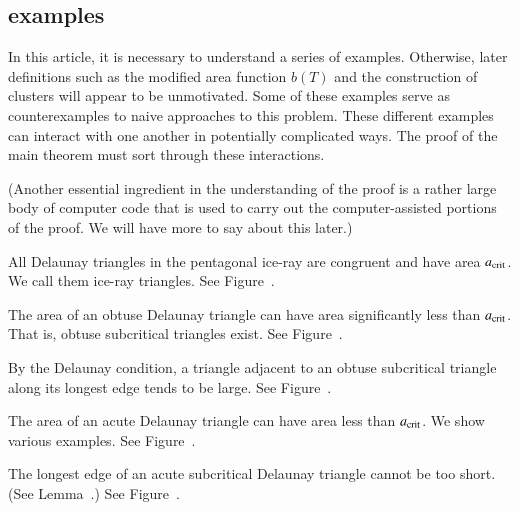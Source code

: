 \subsection{examples}

In this article, it is necessary to understand a series of examples.
Otherwise, later definitions such as the modified area function $b(T)$
and the construction of clusters will appear to be unmotivated.  Some
of these examples serve as counterexamples to naive approaches to this
problem.  These different examples can interact with one another in
potentially complicated ways.  The proof of the main theorem must sort
through these interactions.

(Another essential ingredient in the understanding of the proof is a
rather large body of computer code that is used to carry out the
computer-assisted portions of the proof.  We will have more to say
about this later.)

\begin{example} 
  All Delaunay triangles in the pentagonal ice-ray are congruent and
  have area $a_\text{crit}$.  We call them ice-ray triangles. See
  Figure~.
\end{example}


\begin{example}  
  The area of an obtuse Delaunay triangle can have area significantly
  less than $a_\text{crit}$.  That is, obtuse subcritical triangles exist.
  See Figure~.
\end{example}


\begin{example} 
  By the Delaunay condition, a triangle adjacent to an obtuse
  subcritical triangle along its longest edge tends to be large. See
  Figure~.
\end{example}


\begin{example} 
  The area of an acute Delaunay triangle can have area less than
  $a_\text{crit}$.  We show various examples.  See
  Figure~.
\end{example}


\begin{example} 
  The longest edge of an acute subcritical Delaunay triangle cannot be
  too short.  (See Lemma~.) See
  Figure~.
\end{example}

